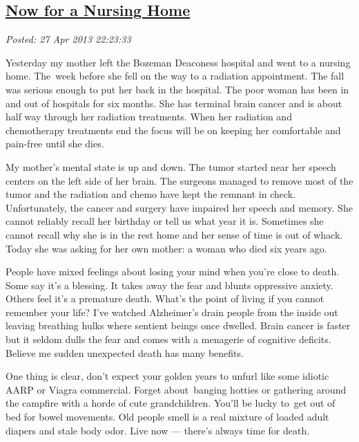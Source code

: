%

\subsection*{\href{https://bakerjd99.wordpress.com/2013/04/27/now-for-a-nursing-home/}{Now for a Nursing Home}}


\noindent\emph{Posted: 27 Apr 2013 22:23:33}
\vspace{6pt}

Yesterday my mother left the Bozeman Deaconess hospital and went to a
nursing home. The~week before she fell on the way to a radiation
appointment. The fall was serious enough to put her back in the
hospital. The poor woman has been in and out of hospitals for six
months. She has terminal brain cancer and is about half way through her
radiation treatments. When her radiation and chemotherapy treatments end
the focus will be on keeping her comfortable and pain-free until she
dies.

My mother's mental state is up and down. The tumor started near her
speech centers on the left side of her brain. The surgeons managed to
remove most of the tumor and the radiation and chemo have kept the
remnant in check. Unfortunately, the cancer and surgery have impaired
her speech and memory. She cannot reliably recall her birthday or tell
us what year it is. Sometimes she cannot recall why she is in the rest
home and her sense of time is out of whack. Today she was asking for her
own mother: a woman who died six years ago.

People have mixed feelings about losing your mind when you're close to
death. Some say it's a blessing. It takes away the fear and blunts
oppressive anxiety. Others feel it's a premature death. What's the point
of living if you cannot remember your life? I've watched Alzheimer's
drain people from the inside out leaving breathing hulks where sentient
beings once dwelled. Brain cancer is faster but it seldom dulls the fear
and comes with a menagerie of cognitive deficits. Believe me sudden
unexpected death has many benefits.

One thing is clear, don't expect your golden years to unfurl like some
idiotic AARP or Viagra commercial. Forget about~banging hotties or
gathering around the campfire with a horde of cute grandchildren. You'll
be lucky to~get out of bed for bowel movements. Old people smell is a
real mixture of loaded adult diapers and stale body odor. Live now ---
there's always time for death.



%